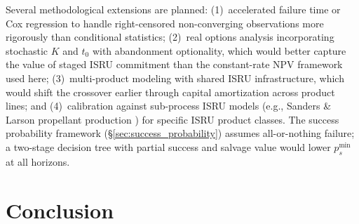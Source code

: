 \documentclass[preprint,12pt]{elsarticle}
\begin{document}
Several methodological extensions are planned: (1)~accelerated failure time or Cox regression to handle right-censored non-converging observations more rigorously than conditional statistics; (2)~real options analysis incorporating stochastic $K$ and $t_0$ with abandonment optionality, which would better capture the value of staged ISRU commitment than the constant-rate NPV framework used here; (3)~multi-product modeling with shared ISRU infrastructure, which would shift the crossover earlier through capital amortization across product lines; and (4)~calibration against sub-process ISRU models (e.g., Sanders \& Larson propellant production \cite{sanders2015}) for specific ISRU product classes. The success probability framework (\S\ref{sec:success_probability}) assumes all-or-nothing failure; a two-stage decision tree with partial success and salvage value would lower $p_s^{\min}$ at all horizons.

\section{Conclusion}
\label{sec:conclusion}
\end{document}
